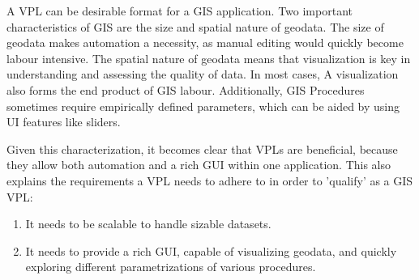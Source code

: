 A VPL can be desirable format for a \ac{GIS} application.
Two important characteristics of \ac{GIS} are the size and spatial nature of geodata.
The size of geodata makes automation a necessity, as manual editing would quickly become labour intensive.
The spatial nature of geodata means that visualization is key in understanding and assessing the quality of data. 
In most cases, A visualization also forms the end product of \ac{GIS} labour.
Additionally, \ac{GIS} Procedures sometimes require empirically defined parameters, which can be aided by using UI features like sliders. 

Given this characterization, it becomes clear that \ac{VPL}s are beneficial, because they allow both automation and a rich \ac{GUI} within one application. 
This also explains the requirements a VPL needs to adhere to in order to 'qualify' as a \ac{GIS} \ac{VPL}:
\begin{enumerate}
  \item It needs to be scalable to handle sizable datasets.
  \item It needs to provide a rich \ac{GUI}, capable of visualizing geodata, and quickly exploring different parametrizations of various procedures.
\end{enumerate}











